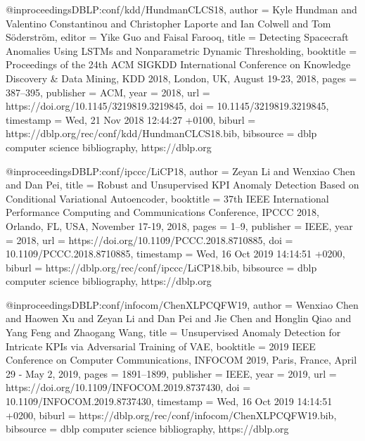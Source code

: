 @inproceedings{DBLP:conf/kdd/HundmanCLCS18,
  author    = {Kyle Hundman and
               Valentino Constantinou and
               Christopher Laporte and
               Ian Colwell and
               Tom S{\"{o}}derstr{\"{o}}m},
  editor    = {Yike Guo and
               Faisal Farooq},
  title     = {Detecting Spacecraft Anomalies Using LSTMs and Nonparametric Dynamic
               Thresholding},
  booktitle = {Proceedings of the 24th {ACM} {SIGKDD} International Conference on
               Knowledge Discovery {\&} Data Mining, {KDD} 2018, London, UK,
               August 19-23, 2018},
  pages     = {387--395},
  publisher = {{ACM}},
  year      = {2018},
  url       = {https://doi.org/10.1145/3219819.3219845},
  doi       = {10.1145/3219819.3219845},
  timestamp = {Wed, 21 Nov 2018 12:44:27 +0100},
  biburl    = {https://dblp.org/rec/conf/kdd/HundmanCLCS18.bib},
  bibsource = {dblp computer science bibliography, https://dblp.org}
}

@inproceedings{DBLP:conf/ipccc/LiCP18,
  author    = {Zeyan Li and
               Wenxiao Chen and
               Dan Pei},
  title     = {Robust and Unsupervised {KPI} Anomaly Detection Based on Conditional
               Variational Autoencoder},
  booktitle = {37th {IEEE} International Performance Computing and Communications
               Conference, {IPCCC} 2018, Orlando, FL, USA, November 17-19, 2018},
  pages     = {1--9},
  publisher = {{IEEE}},
  year      = {2018},
  url       = {https://doi.org/10.1109/PCCC.2018.8710885},
  doi       = {10.1109/PCCC.2018.8710885},
  timestamp = {Wed, 16 Oct 2019 14:14:51 +0200},
  biburl    = {https://dblp.org/rec/conf/ipccc/LiCP18.bib},
  bibsource = {dblp computer science bibliography, https://dblp.org}
}

@inproceedings{DBLP:conf/infocom/ChenXLPCQFW19,
  author    = {Wenxiao Chen and
               Haowen Xu and
               Zeyan Li and
               Dan Pei and
               Jie Chen and
               Honglin Qiao and
               Yang Feng and
               Zhaogang Wang},
  title     = {Unsupervised Anomaly Detection for Intricate KPIs via Adversarial
               Training of {VAE}},
  booktitle = {2019 {IEEE} Conference on Computer Communications, {INFOCOM} 2019,
               Paris, France, April 29 - May 2, 2019},
  pages     = {1891--1899},
  publisher = {{IEEE}},
  year      = {2019},
  url       = {https://doi.org/10.1109/INFOCOM.2019.8737430},
  doi       = {10.1109/INFOCOM.2019.8737430},
  timestamp = {Wed, 16 Oct 2019 14:14:51 +0200},
  biburl    = {https://dblp.org/rec/conf/infocom/ChenXLPCQFW19.bib},
  bibsource = {dblp computer science bibliography, https://dblp.org}
}

